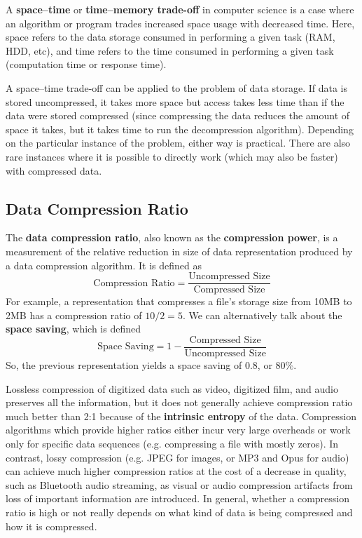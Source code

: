 \documentclass{article}
\begin{document}
  A \textbf{space–time} or \textbf{time–memory trade-off} in computer science is a case where an algorithm or program trades increased space usage with decreased time. Here, space refers to the data storage consumed in performing a given task (RAM, HDD, etc), and time refers to the time consumed in performing a given task (computation time or response time). 

  A space–time trade-off can be applied to the problem of data storage. If data is stored uncompressed, it takes more space but access takes less time than if the data were stored compressed (since compressing the data reduces the amount of space it takes, but it takes time to run the decompression algorithm). Depending on the particular instance of the problem, either way is practical. There are also rare instances where it is possible to directly work (which may also be faster) with compressed data. 

  \subsection{Data Compression Ratio}
  The \textbf{data compression ratio}, also known as the \textbf{compression power}, is a measurement of the relative reduction in size of data representation produced by a data compression algorithm. It is defined as 
  \[\text{Compression Ratio} = \frac{\text{Uncompressed Size}}{\text{Compressed Size}}\]
  For example, a representation that compresses a file's storage size from 10MB to 2MB has a compression ratio of $10/2 = 5$. We can alternatively talk about the \textbf{space saving}, which is defined
  \[\text{Space Saving} = 1 - \frac{\text{Compressed Size}}{\text{Uncompressed Size}}\]
  So, the previous representation yields a space saving of 0.8, or $80\%$. 

  Lossless compression of digitized data such as video, digitized film, and audio preserves all the information, but it does not generally achieve compression ratio much better than 2:1 because of the \textbf{intrinsic entropy} of the data. Compression algorithms which provide higher ratios either incur very large overheads or work only for specific data sequences (e.g. compressing a file with mostly zeros). In contrast, lossy compression (e.g. JPEG for images, or MP3 and Opus for audio) can achieve much higher compression ratios at the cost of a decrease in quality, such as Bluetooth audio streaming, as visual or audio compression artifacts from loss of important information are introduced. In general, whether a compression ratio is high or not really depends on what kind of data is being compressed and how it is compressed. 
\end{document}

